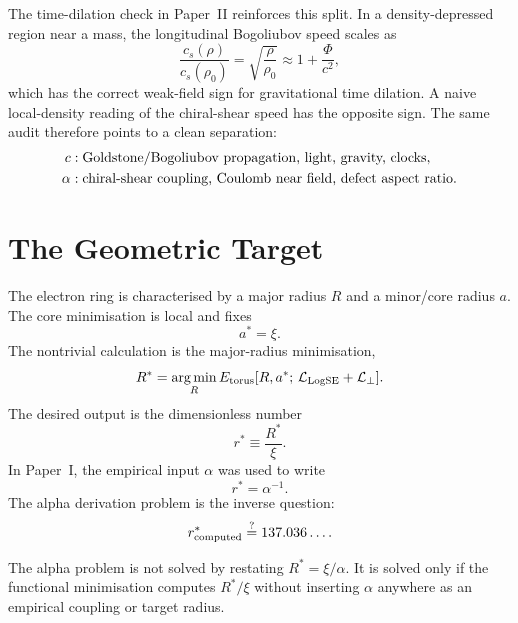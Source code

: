 \documentclass[11pt,a4paper]{article}
\begin{document}
The time-dilation check in Paper~II reinforces this split.  In a
density-depressed region near a mass, the longitudinal Bogoliubov speed
scales as
\begin{equation}
    \frac{c_s(\rho)}{c_s(\rho_0)}
    = \sqrt{\frac{\rho}{\rho_0}}
    \approx 1+\frac{\Phi}{c^2},
    \label{eq:time_dilation_alpha_paper}
\end{equation}
which has the correct weak-field sign for gravitational time dilation.  A
naive local-density reading of the chiral-shear speed has the opposite
sign.  The same audit therefore points to a clean separation:
\begin{align}
    c &: \hbox{Goldstone/Bogoliubov propagation, light, gravity, clocks},\\
    \alpha &: \hbox{chiral-shear coupling, Coulomb near field, defect aspect ratio}.
\end{align}

\section{The Geometric Target}
\label{sec:target}

The electron ring is characterised by a major radius $R$ and a minor/core
radius $a$.  The core minimisation is local and fixes
\begin{equation}
    a^* = \xi .
    \label{eq:core_target}
\end{equation}
The nontrivial calculation is the major-radius minimisation,
\begin{equation}
    R^* = \operatorname*{arg\,min}_{R}
    E_{\rm torus}[R,a^*;\,\mathcal{L}_{\rm LogSE}+\mathcal{L}_{\perp}] .
    \label{eq:R_min}
\end{equation}
The desired output is the dimensionless number
\begin{equation}
    r^* \equiv \frac{R^*}{\xi}.
    \label{eq:rstar}
\end{equation}
In Paper~I, the empirical input $\alpha$ was used to write
\[
    r^* = \alpha^{-1}.
\]
The alpha derivation problem is the inverse question:
\begin{equation}
    r^*_{\rm computed}
    \stackrel{?}{=}
    137.036\ldots .
    \label{eq:alpha_test}
\end{equation}

\begin{gapbox}
The alpha problem is not solved by restating $R^*=\xi/\alpha$.  It is solved
only if the functional minimisation computes $R^*/\xi$ without inserting
$\alpha$ anywhere as an empirical coupling or target radius.
\end{gapbox}
\end{document}
